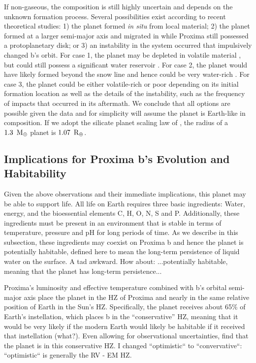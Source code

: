\documentclass[preprint,12pt]{aastex}
\newcommand{\xxx}[1]{{\color{red} #1}} %
\def\mearth{{\rm\,M_\oplus}}
\def\rearth{{\rm\,R_\oplus}}
\begin{document}
If non-gaseous, the composition is still highly uncertain and depends
on the unknown formation process. Several possibilities exist
according to recent theoretical studies: 1) the planet formed {\it in
  situ} from local material; 2) the planet formed at a larger
semi-major axis and migrated in while Proxima still possessed a
protoplanetary disk; or 3) an instability in the system occurred that
impulsively changed b's orbit. For case 1, the planet may be depleted
in volatile material \citep{Raymond07,Lissauer07}, but could still
possess \xxx{a significant water reservoir} \citep{Mulders15}. For case 2,
the planet would have likely formed beyond the snow line and hence
could be very water-rich \citep{CarterBond12}. For case 3, the planet
could be either volatile-rich or poor depending on its initial
formation location as well as the details of the instability, such as
the frequency of impacts that occurred in its aftermath. We conclude
that all options are possible given the data and for simplicity will
assume the planet is Earth-like in composition. If we adopt the
silicate planet scaling law of \cite{Sotin07}, the radius of a
$1.3~\mearth$ planet is $1.07~\rearth$.

\subsection{Implications for Proxima b's Evolution and Habitability}
\label{sec:obs:imp}

Given the above observations and their immediate implications, this
planet may be able to support life. All life on Earth requires three
basic ingredients: Water, energy, and the bioessential elements C, H,
O, N, S and P. Additionally, these ingredients must be present in an
environment that is stable in terms of temperature, pressure and pH
for long periods of time. As we describe in this subsection, these
ingredients may coexist on Proxima b and hence the planet is
potentially habitable, defined here to mean the long-term persistence
of liquid water \xxx{on} the surface. \xxx{A tad awkward. How about: ...potentially
habitable, meaning that the planet has long-term persistence...}

Proxima's luminosity and effective temperature combined with b's
orbital semi-major axis place the planet in the HZ of
Proxima and nearly in the same relative position of Earth in the Sun's
HZ. Specifically, the planet receives about 65\% of Earth's
instellation, which places b in the ``conservative'' HZ, \xxx{meaning that it
would be very likely if the modern Earth would likely be habitable if
it received that instellation (what?)}. Even allowing for observational
uncertainties, \cite{AngladaEscude16} find that the planet is in this
conservative HZ. \xxx{I changed ``optimistic`` to ``convervative``: ``optimistic``
is generally the RV - EM HZ.}
\end{document}
